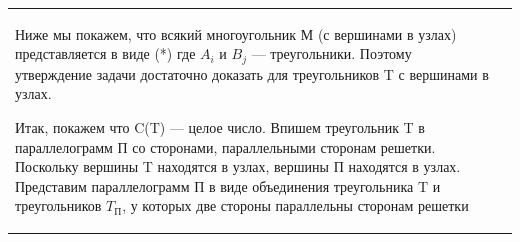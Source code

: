\begin{tabular}{p{50mm} p{120mm}}
{
\vspace{-3mm}
Ниже мы покажем, что всякий многоугольник М (с вершинами в узлах) представляется в виде (*) где $A_i$ и $B_j$ --- треугольники. Поэтому утверждение задачи достаточно доказать для треугольников T с вершинами в узлах.

Итак, покажем что C(T) --- целое число. Впишем треугольник T в параллелограмм П со сторонами, параллельными сторонам решетки. Поскольку вершины T находятся в узлах, вершины П находятся в узлах. 
Представим параллелограмм П в виде объединения треугольника T и треугольников $T_{\text{П}}$, у которых две стороны параллельны сторонам решетки
}
\end{tabular}

